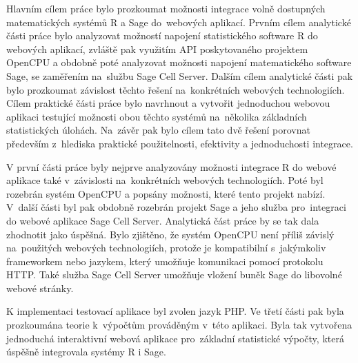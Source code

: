 \documentclass[thesis=B,czech]{FITthesis}[2012/06/26]
\begin{document}
\begin{conclusion}
Hlavním cílem práce bylo prozkoumat možnosti integrace volně dostupných matematických systémů R a Sage do~webových aplikací. Prvním cílem analytické části práce bylo analyzovat možností napojení statistického software R do webových aplikací, zvláště pak využitím API poskytovaného projektem OpenCPU a obdobně poté analyzovat možnosti napojení matematického software Sage, se zaměřením na~službu Sage Cell Server. Dalším cílem analytické části pak bylo prozkoumat závislost těchto řešení na~konkrétních webových technologiích. Cílem praktické části práce bylo navrhnout a vytvořit jednoduchou webovou aplikaci testující možnosti obou těchto systémů na~několika základních statistických úlohách. Na~závěr pak bylo cílem tato dvě řešení porovnat především z~hlediska praktické použitelnosti, efektivity a jednoduchosti integrace.

V první části práce byly nejprve analyzovány možnosti integrace R do webové aplikace také v~závislosti na~konkrétních webových technologiích. Poté byl rozebrán systém OpenCPU a popsány možnosti, které tento projekt nabízí. V~další části byl pak obdobně rozebrán projekt Sage a jeho služba pro~integraci do webové aplikace Sage Cell Server. Analytická část práce by se tak dala zhodnotit jako úspěšná. Bylo zjištěno, že systém OpenCPU není příliš závislý na~použitých webových technologiích, protože je kompatibilní s~jakýmkoliv frameworkem nebo jazykem, který umožňuje komunikaci pomocí protokolu HTTP. Také služba Sage Cell Server umožňuje vložení buněk Sage do libovolné webové stránky. 

K implementaci testovací aplikace byl zvolen jazyk PHP. Ve třetí části pak byla prozkoumána teorie k~výpočtům prováděným v~této aplikaci. Byla tak vytvořena jednoduchá interaktivní webová aplikace pro~základní statistické výpočty, která úspěšně integrovala systémy R i Sage. 


\end{conclusion}
\end{document}
